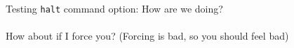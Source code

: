 \documentclass{article}
\begin{document}
Testing \texttt{halt} command option: How are we doing?\\
\\
How about if I force you? (Forcing is bad, so you should feel bad)\\
\end{document}
